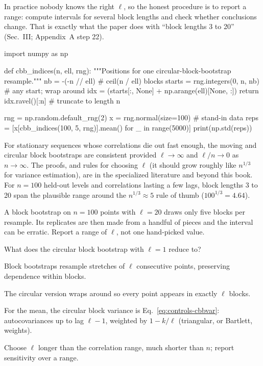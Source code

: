 In practice nobody knows the right $\ell$, so the honest procedure is to report a range: compute intervals for several block lengths and check whether conclusions change. That is exactly what the paper does with ``block lengths 3 to 20'' (Sec.~III; Appendix~A step 22).

\begin{pycode}
import numpy as np

def cbb_indices(n, ell, rng):
    """Positions for one circular-block-bootstrap resample."""
    nb = -(-n // ell)                       # ceil(n / ell) blocks
    starts = rng.integers(0, n, nb)         # any start; wrap around
    idx = (starts[:, None] + np.arange(ell)[None, :]) %
    return idx.ravel()[:n]                  # truncate to length n

rng = np.random.default_rng(2)
x = rng.normal(size=100)                    # stand-in data
reps = [x[cbb_indices(100, 5, rng)].mean() for _ in range(5000)]
print(np.std(reps))
\end{pycode}

\begin{beyond}
For stationary sequences whose correlations die out fast enough, the moving and circular block bootstraps are consistent provided $\ell\to\infty$ and $\ell/n\to0$ as $n\to\infty$. The proofs, and rules for choosing $\ell$ (it should grow roughly like $n^{1/3}$ for variance estimation), are in the specialized literature and beyond this book. For $n=100$ held-out levels and correlations lasting a few lags, block lengths 3 to 20 span the plausible range around the $n^{1/3}\approx5$ rule of thumb ($100^{1/3}=4.64$).
\end{beyond}

\begin{pitfall}
A block bootstrap on $n=100$ points with $\ell=20$ draws only five blocks per resample. Its replicates are then made from a handful of pieces and the interval can be erratic. Report a range of $\ell$, not one hand-picked value.
\end{pitfall}

\begin{checkpoint}
What does the circular block bootstrap with $\ell=1$ reduce to?
\end{checkpoint}

\begin{keyideas}
\item Block bootstraps resample stretches of $\ell$ consecutive points, preserving dependence within blocks.
\item The circular version wraps around so every point appears in exactly $\ell$ blocks.
\item For the mean, the circular block variance is Eq.~\eqref{eq:controls-cbbvar}: autocovariances up to lag $\ell-1$, weighted by $1-k/\ell$ (triangular, or Bartlett, weights).
\item Choose $\ell$ longer than the correlation range, much shorter than $n$; report sensitivity over a range.
\end{keyideas}

